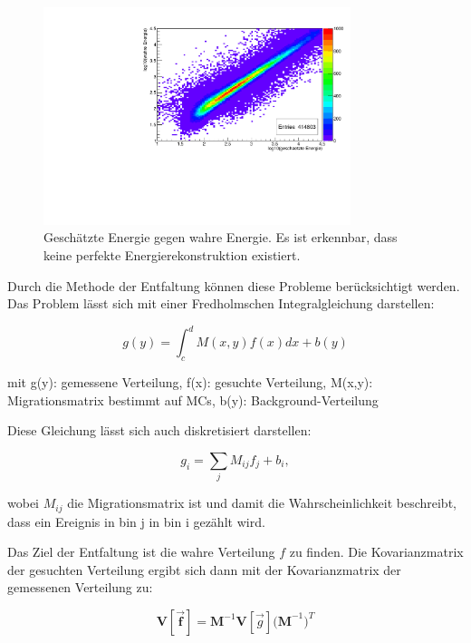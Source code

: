\begin{figure}
    \centering
    \includegraphics[width=0.8\textwidth]{./Plots/04_MrkAnalyse/EnergyEst_EnergyTrue.pdf}
    \caption{Geschätzte Energie gegen wahre Energie. Es ist erkennbar, dass keine perfekte Energierekonstruktion existiert.}
    \label{EnergyEst_EnergyTrue}
\end{figure}

Durch die Methode der Entfaltung können diese Probleme berücksichtigt werden. 
Das Problem lässt sich mit einer Fredholmschen Integralgleichung darstellen:

\begin{equation}
 g(y)= \int_c^d M(x,y) f(x) dx + b(y)
\end{equation}
\begin{centering}
  \tiny{mit g(y): gemessene Verteilung, f(x): gesuchte Verteilung, M(x,y): Migrationsmatrix bestimmt auf MCs, b(y): Background-Verteilung}
 \end{centering}

Diese Gleichung lässt sich auch diskretisiert darstellen:

\begin{equation}
 g_i=\sum_j M_{ij}f_j+b_i,
\end{equation}

wobei $M_{ij}$ die Migrationsmatrix ist und damit die Wahrscheinlichkeit beschreibt, dass ein Ereignis in bin j in bin i gezählt wird.

Das Ziel der Entfaltung ist die wahre Verteilung $f$ zu finden.
Die Kovarianzmatrix der gesuchten Verteilung ergibt sich dann mit der Kovarianzmatrix der gemessenen Verteilung zu:

\begin{equation}
 \mathbf{V[\vec{f}]}=\mathbf{M}^{-1}\mathbf{V}[\vec{g}]\mathbf{(M}^{-1})^T
\end{equation}

